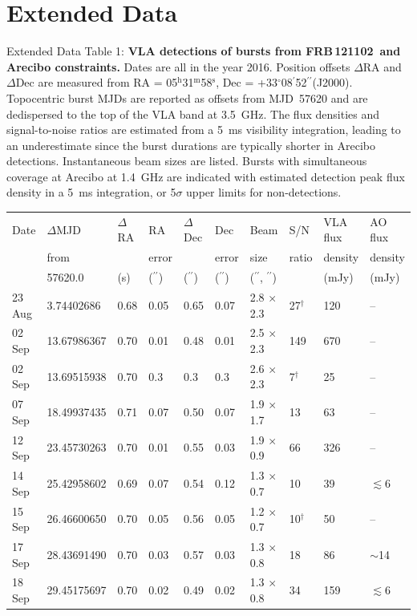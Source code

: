 \documentclass{nature_frb}
\newcommand{\frb}{FRB\,121102}
\newcommand{\arcsec}{\ensuremath{^{\prime\prime}}}
\newcommand{\arcmin}{\ensuremath{^{\prime}}}
\newcommand{\degree}{\ensuremath{^\circ}}
\newcommand{\hs}{\ensuremath{^{\mathrm{s}}}}
\newcommand{\hm}{\ensuremath{^{\mathrm{m}}}}
\newcommand{\hh}{\ensuremath{^{\mathrm{h}}}}
\begin{document}
\clearpage
\section*{Extended Data}


\bigskip\noindent
Extended Data Table 1: {\bf VLA detections of bursts from \frb\ and Arecibo constraints.}
Dates are all in the year 2016. Position offsets $\Delta$RA and $\Delta$Dec are measured from RA = 05\hh31\hm58\hs, Dec = +33\degree08\arcmin52\arcsec (J2000). Topocentric burst MJDs are reported as offsets from MJD~57620 and are dedispersed to the top of the VLA band at 3.5~GHz. The flux densities and signal-to-noise ratios are estimated from a 5~ms visibility integration, leading to an underestimate since the burst durations are typically shorter in Arecibo detections. Instantaneous beam sizes are listed. Bursts with simultaneous coverage at Arecibo at 1.4~GHz are indicated with estimated detection peak flux density in a 5~ms integration, or 5$\sigma$ upper limits for non-detections.


\begin{table}
{\label{tab:bursts}}
\medskip
\begin{tabular}{llllllllll}
\hline
\hline
Date & $\Delta$MJD & $\Delta$RA & RA & $\Delta$Dec & Dec & Beam & S/N & VLA flux & AO flux \\
& from & & error & & error & size & ratio & density & density \\
 & 57620.0 & (s) & (\arcsec) & (\arcsec) & (\arcsec) & (\arcsec, \arcsec) & & (mJy) & (mJy) \\[1mm]
\hline
23 Aug & 3.74402686 & 0.68 & 0.05  & 0.65 & 0.07 & 2.8 $\times$ 2.3 & 27$^\dag$ & 120 & --\\
02 Sep & 13.67986367 & 0.70 & 0.01 & 0.48 & 0.01 & 2.5 $\times$ 2.3 & 149 & 670 & -- \\
02 Sep & 13.69515938 & 0.70 & 0.3  & 0.3 & 0.3 & 2.6 $\times$ 2.3 & 7$^\dag$ & 25 & --  \\
07 Sep & 18.49937435 & 0.71 & 0.07 & 0.50 & 0.07 & 1.9 $\times$ 1.7 & 13 & 63 & -- \\
12 Sep & 23.45730263 & 0.70 & 0.01 & 0.55 & 0.03 & 1.9 $\times$ 0.9 & 66 & 326 & -- \\
14 Sep & 25.42958602 & 0.69 & 0.07 & 0.54 & 0.12 & 1.3 $\times$ 0.7 & 10 & 39 & $\lesssim$6 \\
15 Sep & 26.46600650 & 0.70 & 0.05 & 0.56 & 0.05 & 1.2 $\times$ 0.7 & 10$^\dag$  & 50 & -- \\
17 Sep & 28.43691490 & 0.70 & 0.03 & 0.57 & 0.03 & 1.3 $\times$ 0.8 & 18 & 86 & $\sim$14 \\
18 Sep & 29.45175697 & 0.70 & 0.02 & 0.49 & 0.02 & 1.3 $\times$ 0.8 & 34 & 159 & $\lesssim$6 \\
\hline
\hline
\end{tabular}
\end{table}
\end{document}
